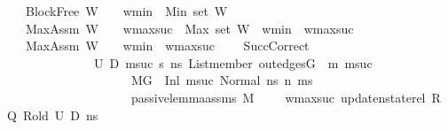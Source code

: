 \begin{isabellebody}
\ \ \ BlockFree{\isacharcolon}{\kern0pt}\ {\isachardoublequoteopen}W\ {\isasymnoteq}\ {\isacharbrackleft}{\kern0pt}{\isacharbrackright}{\kern0pt}\ {\isasymLongrightarrow}\ w{\isacharunderscore}{\kern0pt}min\ {\isasymle}\ Min\ {\isacharparenleft}{\kern0pt}set\ W{\isacharparenright}{\kern0pt}{\isachardoublequoteclose}\ \ \isanewline
\ \ \ MaxAssm{\isacharcolon}{\kern0pt}\ {\isachardoublequoteopen}W\ {\isasymnoteq}\ {\isacharbrackleft}{\kern0pt}{\isacharbrackright}{\kern0pt}\ {\isasymLongrightarrow}\ w{\isacharunderscore}{\kern0pt}max{\isacharunderscore}{\kern0pt}suc\ {\isacharequal}{\kern0pt}\ {}{\isacharplus}{\kern0pt}Max\ {\isacharparenleft}{\kern0pt}set\ W{\isacharparenright}{\kern0pt}\ {\isasymand}\ w{\isacharunderscore}{\kern0pt}min\ {\isacharless}{\kern0pt}\ w{\isacharunderscore}{\kern0pt}max{\isacharunderscore}{\kern0pt}suc{\isachardoublequoteclose}\ \ \ \ \isanewline
\ \ \ MaxAssm{}{\isacharcolon}{\kern0pt}\ {\isachardoublequoteopen}W\ {\isacharequal}{\kern0pt}\ {\isacharbrackleft}{\kern0pt}{\isacharbrackright}{\kern0pt}\ {\isasymLongrightarrow}\ w{\isacharunderscore}{\kern0pt}min\ {\isacharequal}{\kern0pt}\ w{\isacharunderscore}{\kern0pt}max{\isacharunderscore}{\kern0pt}suc{\isachardoublequoteclose}\ \isanewline
\ \ \ SuccCorrect{\isacharcolon}{\kern0pt}\isanewline
\ \ \ \ \ \ \ \ \ \ \ \ \ {\isachardoublequoteopen}{\isasymAnd}\ U{}\ D{}\ msuc\ s{\isacharprime}{\kern0pt}\ ns{\isacharprime}{\kern0pt}{\isachardot}{\kern0pt}\ List{\isachardot}{\kern0pt}member\ {\isacharparenleft}{\kern0pt}out{\isacharunderscore}{\kern0pt}edges{\isacharparenleft}{\kern0pt}G{}{\isacharparenright}{\kern0pt}\ {\isacharbang}{\kern0pt}\ m{\isacharparenright}{\kern0pt}\ msuc\ {\isasymLongrightarrow}\isanewline
\ \ \ \ \ \ \ \ \ \ \ \ \ \ \ \ \ \ \ \ M{\isacharcomma}{\kern0pt}{\isasymLambda}{}{\isacharcomma}{\kern0pt}{\isasymGamma}{\isacharcomma}{\kern0pt}{\isasymOmega}{\isacharcomma}{\kern0pt}G{}\ {\isasymturnstile}\ {\isacharparenleft}{\kern0pt}{\isacharparenleft}{\kern0pt}Inl\ msuc{\isacharparenright}{\kern0pt}{\isacharcomma}{\kern0pt}\ Normal\ ns{\isacharprime}{\kern0pt}{\isacharparenright}{\kern0pt}\ {\isacharminus}{\kern0pt}n{\isasymrightarrow}{\isacharasterisk}{\kern0pt}\ {\isacharparenleft}{\kern0pt}m{\isacharprime}{\kern0pt}{\isacharcomma}{\kern0pt}s{\isacharprime}{\kern0pt}{\isacharparenright}{\kern0pt}\ {\isasymLongrightarrow}\ \ \isanewline
\ \ \ \ \ \ \ \ \ \ \ \ \ \ \ \ \ \ \ \ passive{\isacharunderscore}{\kern0pt}lemma{\isacharunderscore}{\kern0pt}assms{\isacharunderscore}{\kern0pt}{}\ M\ {\isasymLambda}{}\ {\isasymLambda}{}\ {\isasymGamma}\ {\isasymOmega}\ w{\isacharunderscore}{\kern0pt}max{\isacharunderscore}{\kern0pt}suc\ {\isacharparenleft}{\kern0pt}update{\isacharunderscore}{\kern0pt}nstate{\isacharunderscore}{\kern0pt}rel\ R\ Q{\isacharparenright}{\kern0pt}\ R{\isacharunderscore}{\kern0pt}old\ U{}\ D{}\ ns{\isacharprime}{\kern0pt}\ {\isasymLongrightarrow}\isanewline

\end{isabellebody}
